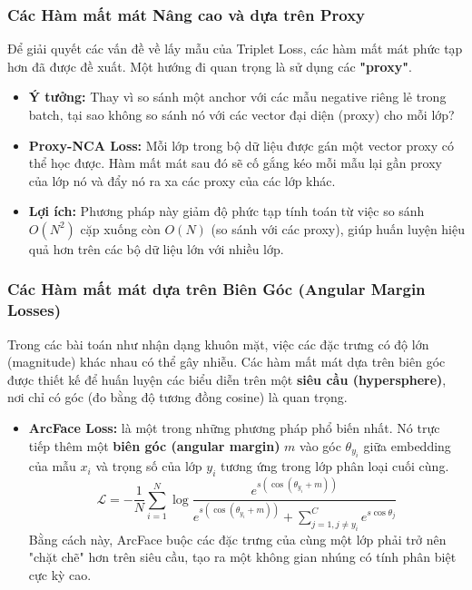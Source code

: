 \subsubsection{Các Hàm mất mát Nâng cao và dựa trên Proxy}
\label{subsubsec:advanced_metric_losses}
Để giải quyết các vấn đề về lấy mẫu của Triplet Loss, các hàm mất mát phức tạp hơn đã được đề xuất. Một hướng đi quan trọng là sử dụng các \textbf{"proxy"}.
\begin{itemize}
	\item \textbf{Ý tưởng:} Thay vì so sánh một anchor với các mẫu negative riêng lẻ trong batch, tại sao không so sánh nó với các vector đại diện (proxy) cho mỗi lớp?
	\item \textbf{Proxy-NCA Loss:} Mỗi lớp trong bộ dữ liệu được gán một vector proxy có thể học được. Hàm mất mát sau đó sẽ cố gắng kéo mỗi mẫu lại gần proxy của lớp nó và đẩy nó ra xa các proxy của các lớp khác.
	\item \textbf{Lợi ích:} Phương pháp này giảm độ phức tạp tính toán từ việc so sánh $O(N^2)$ cặp xuống còn $O(N)$ (so sánh với các proxy), giúp huấn luyện hiệu quả hơn trên các bộ dữ liệu lớn với nhiều lớp.
\end{itemize}

\subsubsection{Các Hàm mất mát dựa trên Biên Góc (Angular Margin Losses)}
\label{subsubsec:angular_margin_losses}
Trong các bài toán như nhận dạng khuôn mặt, việc các đặc trưng có độ lớn (magnitude) khác nhau có thể gây nhiễu. Các hàm mất mát dựa trên biên góc được thiết kế để huấn luyện các biểu diễn trên một \textbf{siêu cầu (hypersphere)}, nơi chỉ có góc (đo bằng độ tương đồng cosine) là quan trọng.
\begin{itemize}
	\item \textbf{ArcFace Loss:} \cite{Deng2019} là một trong những phương pháp phổ biến nhất. Nó trực tiếp thêm một \textbf{biên góc (angular margin)} $m$ vào góc $\theta_{y_i}$ giữa embedding của mẫu $x_i$ và trọng số của lớp $y_i$ tương ứng trong lớp phân loại cuối cùng.
	\begin{equation}
		\mathcal{L} = -\frac{1}{N} \sum_{i=1}^{N} \log \frac{e^{s(\cos(\theta_{y_i} + m))}}{e^{s(\cos(\theta_{y_i} + m))} + \sum_{j=1, j\neq y_i}^{C} e^{s\cos\theta_j}}
	\end{equation}
	Bằng cách này, ArcFace buộc các đặc trưng của cùng một lớp phải trở nên "chặt chẽ" hơn trên siêu cầu, tạo ra một không gian nhúng có tính phân biệt cực kỳ cao.
\end{itemize}

